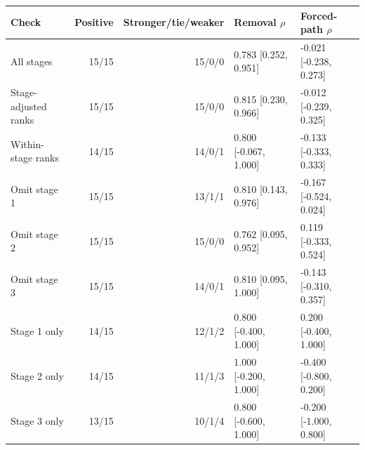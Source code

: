 \begin{tabular}{lrrll}
\toprule
Check & Positive & Stronger/tie/weaker & Removal $\rho$ & Forced-path $\rho$ \\
\midrule
All stages & 15/15 & 15/0/0 & 0.783 [0.252, 0.951] & -0.021 [-0.238, 0.273] \\
Stage-adjusted ranks & 15/15 & 15/0/0 & 0.815 [0.230, 0.966] & -0.012 [-0.239, 0.325] \\
Within-stage ranks & 14/15 & 14/0/1 & 0.800 [-0.067, 1.000] & -0.133 [-0.333, 0.333] \\
Omit stage 1 & 15/15 & 13/1/1 & 0.810 [0.143, 0.976] & -0.167 [-0.524, 0.024] \\
Omit stage 2 & 15/15 & 15/0/0 & 0.762 [0.095, 0.952] & 0.119 [-0.333, 0.524] \\
Omit stage 3 & 15/15 & 14/0/1 & 0.810 [0.095, 1.000] & -0.143 [-0.310, 0.357] \\
Stage 1 only & 14/15 & 12/1/2 & 0.800 [-0.400, 1.000] & 0.200 [-0.400, 1.000] \\
Stage 2 only & 14/15 & 11/1/3 & 1.000 [-0.200, 1.000] & -0.400 [-0.800, 0.200] \\
Stage 3 only & 13/15 & 10/1/4 & 0.800 [-0.600, 1.000] & -0.200 [-1.000, 0.800] \\
\bottomrule
\end{tabular}
